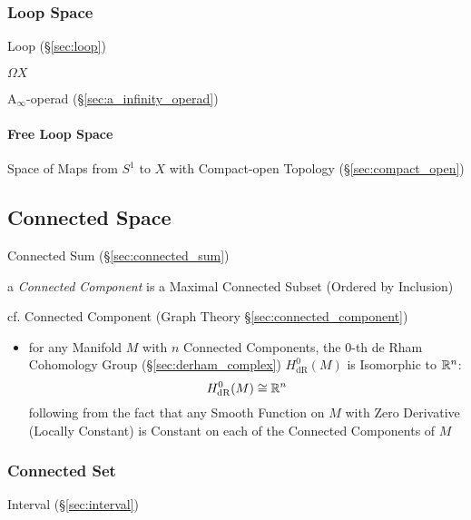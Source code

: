 \subsubsection{Loop Space}\label{sec:loop_space}

Loop (\S\ref{sec:loop})

$\Omega X$

A$_\infty$-operad (\S\ref{sec:a_infinity_operad})



\paragraph{Free Loop Space}\label{sec:free_loop_space}\hfill

Space of Maps from $S^1$ to $X$ with Compact-open Topology
(\S\ref{sec:compact_open})



\subsection{Connected Space}\label{sec:connected_space}

\fist Connected Sum (\S\ref{sec:connected_sum})

a \emph{Connected Component} is a Maximal Connected Subset (Ordered by
Inclusion)

\fist cf. Connected Component (Graph Theory \S\ref{sec:connected_component})

\begin{itemize}
  \item for any Manifold $M$ with $n$ Connected Components, the $0$-th de Rham
    Cohomology Group (\S\ref{sec:derham_complex}) $H_{\mathrm{dR}}^0(M)$ is
    Isomorphic to $\mathbb{R}^n$:
    \[
      H_{\mathrm{dR}}^0(M) \cong \mathbb{R}^n
    \]
    following from the fact that any Smooth Function on $M$ with Zero Derivative
    (Locally Constant) is Constant on each of the Connected Components of $M$
\end{itemize}



\subsubsection{Connected Set}\label{sec:connected_set}

Interval (\S\ref{sec:interval})



